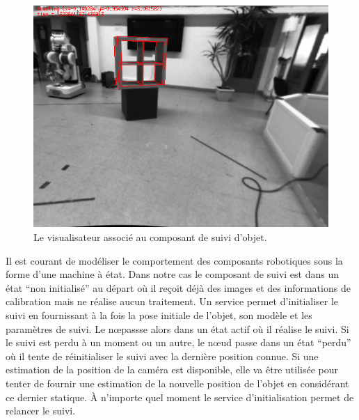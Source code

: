 \begin{figure}
  \begin{center}
    \includegraphics[width=.95\linewidth]{src/chap4-integration/shelf.png}
  \end{center}
  \caption{Le visualisateur associé au composant de suivi d'objet.}
\end{figure}



Il est courant de modéliser le comportement des composants robotiques
sous la forme d'une machine à état. Dans notre cas le composant de
suivi est dans un état ``non initialisé'' au départ où il reçoit déjà
des images et des informations de calibration mais ne réalise aucun
traitement. Un service permet d'initialiser le suivi en fournissant à
la fois la pose initiale de l'objet, son modèle et les paramètres de
suivi. Le n\oe passse alors dans un état actif où il réalise le
suivi. Si le suivi est perdu à un moment ou un autre, le n\oe ud passe
dans un état ``perdu'' où il tente de réinitialiser le suivi avec la
dernière position connue. Si une estimation de la position de la
caméra est disponible, elle va être utilisée pour tenter de fournir
une estimation de la nouvelle position de l'objet en considérant ce
dernier statique. À n'importe quel moment le service d'initialisation
permet de relancer le suivi.


